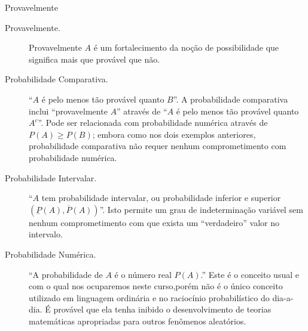 \begin{frame}
\begin{block}{Provavelmente}
%
\begin{description}
\item[Provavelmente.] Provavelmente $A$ é um fortalecimento da noção
de possibilidade que significa mais que provável que não.

\item[Probabilidade Comparativa.] ``$A$ é pelo menos tão provável quanto
$B$''. A probabilidade comparativa inclui ``provavelmente $A$''
através de ``$A$ é pelo menos tão provável quanto $A^c$''. Pode ser
relacionada com probabilidade numérica através de $P(A)\geq P(B)$;
embora como nos dois exemplos anteriores, probabilidade comparativa
não requer nenhum comprometimento com probabilidade numérica.

\item[Probabilidade Intervalar.] ``$A$ tem probabilidade intervalar, ou probabilidade inferior e superior\\
$(\underline{P}(A),\overline{P}(A))$''. Isto permite um grau de
indeterminação variável sem nenhum comprometimento com que exista um
``verdadeiro'' valor no intervalo.

\item[Probabilidade Numérica.] ``A probabilidade de $A$ é o número real
$P(A)$.'' Este é o conceito usual e com o qual nos ocuparemos neste
curso,porém não é o único conceito
utilizado em linguagem ordinária e no raciocínio probabilístico do
dia-a-dia.  É provável que ela tenha
inibido o desenvolvimento de teorias matemáticas apropriadas para
outros fenômenos aleatórios.
\end{description}
\end{block}
\end{frame}
%
%
%
%
